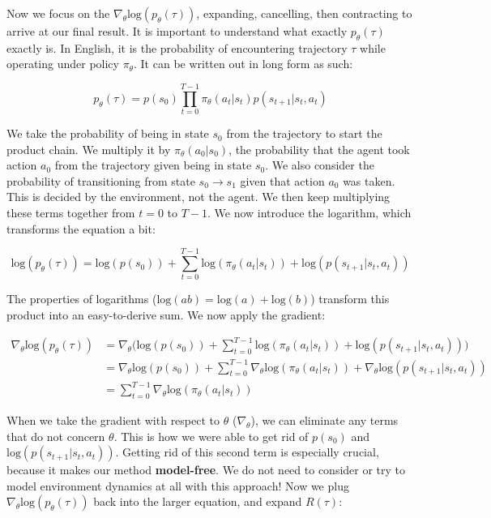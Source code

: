     Now we focus on the $\nabla_\theta \mathrm{log}(p_\theta(\tau))$, expanding, cancelling, then contracting to arrive at our final result. It is important to understand what exactly $p_\theta(\tau)$ exactly is. In English, it is the probability of encountering trajectory $\tau$ while operating under policy $\pi_\theta$. It can be written out in long form as such:

    $$p_\theta(\tau) = p(s_0) \prod_{t=0}^{T-1} \pi_\theta(a_t|s_t)p(s_{t+1}|s_t,a_t)$$

    We take the probability of being in state $s_0$ from the trajectory to start the product chain. We multiply it by $\pi_\theta(a_0|s_0)$, the probability that the agent took action $a_0$ from the trajectory given being in state $s_0$. We also consider the probability of transitioning from state $s_0 \rightarrow s_1$ given that action $a_0$ was taken. This is decided by the environment, not the agent. We then keep multiplying these terms together from $t=0$ to $T-1$. We now introduce the logarithm, which transforms the equation a bit:

    $$\mathrm{log}(p_\theta(\tau)) = \mathrm{log}(p(s_0)) + \sum_{t=0}^{T-1} \mathrm{log}(\pi_\theta(a_t|s_t)) + \mathrm{log}(p(s_{t+1}|s_t,a_t))$$

    The properties of logarithms ($\mathrm{log}(ab) = \mathrm{log}(a) + \mathrm{log}(b)$) transform this product into an easy-to-derive sum. We now apply the gradient:
    
    \begin{align*}
        \nabla_\theta \mathrm{log}(p_\theta(\tau)) &= \nabla_\theta \biggl(\mathrm{log}(p(s_0)) + \sum_{t=0}^{T-1} \mathrm{log}(\pi_\theta(a_t|s_t)) + \mathrm{log}(p(s_{t+1}|s_t,a_t))\biggr)\\
        &= \nabla_\theta \mathrm{log}(p(s_0)) + \sum_{t=0}^{T-1} \nabla_\theta\mathrm{log}(\pi_\theta(a_t|s_t)) + \nabla_\theta\mathrm{log}(p(s_{t+1}|s_t,a_t)) \\
        &= \sum_{t=0}^{T-1} \nabla_\theta\mathrm{log}(\pi_\theta(a_t|s_t))
    \end{align*}

    When we take the gradient with respect to $\theta$ ($\nabla_\theta$), we can eliminate any terms that do not concern $\theta$. This is how we were able to get rid of $p(s_0)$ and $\mathrm{log}(p(s_{t+1}|s_t,a_t))$. Getting rid of this second term is especially crucial, because it makes our method \textbf{model-free}. We do not need to consider or try to model environment dynamics at all with this approach! Now we plug $\nabla_\theta \mathrm{log}(p_\theta(\tau))$ back into the larger equation, and expand $R(\tau)$:

